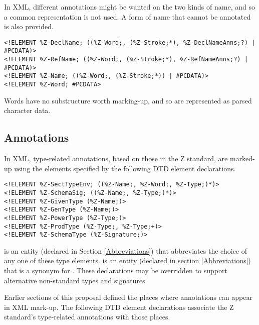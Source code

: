 \documentclass[a4paper,10pt]{article}
\begin{document}
In XML, different annotations might be wanted on the two kinds of name,
and so a common representation is not used.
A form of name that cannot be annotated is also provided.

\begin{verbatim}
<!ELEMENT %Z-DeclName; ((%Z-Word;, (%Z-Stroke;*), %Z-DeclNameAnns;?) | #PCDATA)>
<!ELEMENT %Z-RefName; ((%Z-Word;, (%Z-Stroke;*), %Z-RefNameAnns;?) | #PCDATA)>
<!ELEMENT %Z-Name; ((%Z-Word;, (%Z-Stroke;*)) | #PCDATA)>
<!ELEMENT %Z-Word; #PCDATA>
\end{verbatim}

Words have no substructure worth marking-up,
and so are represented as parsed character data.

\subsection{Annotations}\label{annotations}

In XML, type-related annotations, based on those in the Z standard,
are marked-up using the elements specified by
the following DTD element declarations.

\begin{verbatim}
<!ELEMENT %Z-SectTypeEnv; ((%Z-Name;, %Z-Word;, %Z-Type;)*)>
<!ELEMENT %Z-SchemaSig; ((%Z-Name;, %Z-Type;)*)>
<!ELEMENT %Z-GivenType (%Z-Name;)>
<!ELEMENT %Z-GenType (%Z-Name;)>
<!ELEMENT %Z-PowerType (%Z-Type;)>
<!ELEMENT %Z-ProdType (%Z-Type;, %Z-Type;+)>
<!ELEMENT %Z-SchemaType (%Z-Signature;)>
\end{verbatim}

 is an entity (declared in Section \ref{Abbreviations})
that abbreviates the choice of any one of these type elements.
 is an entity (declared in section \ref{Abbreviations})
that is a synonym for .
These declarations may be overridden to support
alternative non-standard types and signatures.

Earlier sections of this proposal defined the places
where annotations can appear in XML mark-up.
The following DTD element declarations
associate the Z standard's type-related annotations with those places.
\end{document}
